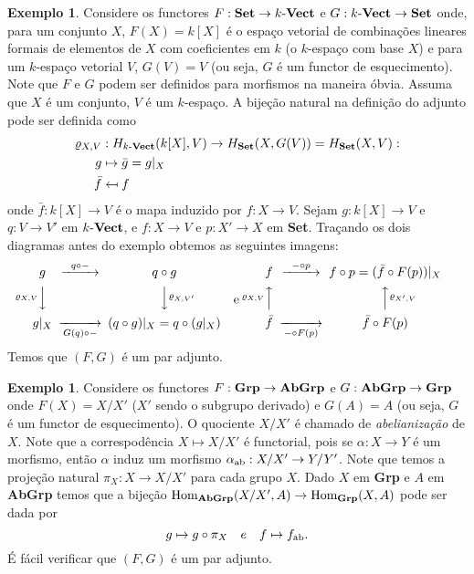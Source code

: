 \documentclass[12pt]{amsart}
\theoremstyle{definition}
\newtheorem{example}[theorem]{Exemplo}
\begin{document}
\begin{example}\label{ex:vect}
    Considere os functores $F:{\bf Set}\to k\mbox{-\bf Vect}$ e $G:k\mbox{-\bf Vect}\to {\bf Set}$ onde, para um conjunto $X$,  $F(X)=k[X]$ é o espaço vetorial de combinações lineares formais  
    de elementos de $X$ com coeficientes em $k$ (o $k$-espaço com base $X$) 
    e para um $k$-espaço vetorial $V$, $G(V)=V$ (ou seja, 
    $G$ é um functor de esquecimento). 
    Note que $F$ e $G$ podem ser definidos para morfismos na maneira óbvia. 
    Assuma que $X$ é um conjunto, $V$ é um $k$-espaço. 
    A bijeção natural na definição do adjunto  pode ser definida como 
    \begin{align*}
        \varrho_{X,V}&:H_{k\textrm{-\bf Vect}}(k[X],V)\to H_{\bf Set}(X,G(V))=H_{\bf Set}(X,V):\\
        g&\mapsto \bar g=g|_X\\
        \bar f&\mapsfrom f
    \end{align*}
    onde $\bar f:k[X]\to V$ é o mapa induzido por $f:X\to V$.
    Sejam $g:k[X]\to V$ e $q:V\to V'$ em $k\textrm{-\bf Vect}$, e $f:X\to V$ e $p:X'\to X$
    em {\bf Set}. 
    Traçando os dois diagramas antes do exemplo obtemos as seguintes imagens:
    \[
    \begin{CD}
        g @>{q\circ-}>> q\circ g\\
        @V{\varrho_{X,V}}VV @VV{\varrho_{X,V'}}V\\
        g|_X @>>{G(q)\circ -}>(q\circ g)|_X=q\circ(g|_X)
    \end{CD}
    \quad
    \mbox{e}
    \qquad
\begin{CD}
    f @>{-\circ p}>> f\circ p=(\bar f \circ F(p))|_X\\
    @A{\varrho_{X,V}}AA @AA{\varrho_{X',V}}A\\
    \bar f @>>{-\circ F(p)}>\bar f\circ F(p)
\end{CD}
\]
Temos que $(F,G)$ é um par adjunto.
\end{example}

\begin{example}
    Considere os functores $F:{\bf Grp}\to {\bf AbGrp}$ e $G:{\bf AbGrp}\to {\bf Grp}$ onde 
    $F(X)=X/X'$ ($X'$ sendo o subgrupo derivado) e $G(A)=A$
    (ou seja, $G$ é um functor de esquecimento). 
    O quociente $X/X'$ é chamado de \emph{abelianização} de $X$. 
    Note que a correspodência $X\mapsto X/X'$ é functorial, pois se 
    $\alpha:X\to Y$ é um morfismo, então $\alpha$ induz um morfismo $\alpha_{\rm ab}:X/X'\to Y/Y'$.
    Note que temos a projeção natural $\pi_X:X\to X/X'$ para cada grupo $X$.
    Dado $X$ em {\bf Grp} e $A$ em {\bf AbGrp} temos que a bijeção 
    $\mbox{Hom}_{\bf AbGrp}(X/X',A)\to \mbox{Hom}_{\bf Grp}(X,A)$ pode ser dada por 
    \[
        g\mapsto g\circ\pi_X\quad e \quad f\mapsto f_{\rm ab}.
    \]  
    É fácil verificar que $(F,G)$ é um par adjunto.
\end{example}
\end{document}
